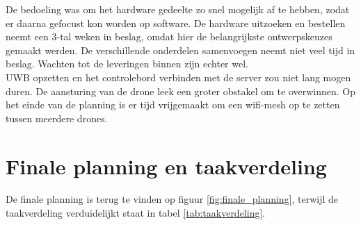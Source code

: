 De bedoeling was om het hardware gedeelte zo snel mogelijk af te hebben, zodat er daarna gefocust kon worden op software.
De hardware uitzoeken en bestellen neemt een 3-tal weken in beslag, omdat hier de belangrijkste ontwerpskeuzes gemaakt werden.
De verschillende onderdelen samenvoegen neemt niet veel tijd in beslag.
Wachten tot de leveringen binnen zijn echter wel.\\

UWB opzetten en het controlebord verbinden met de server zou niet lang mogen duren.
De aansturing van de drone leek een groter obstakel om te overwinnen.
Op het einde van de planning is er tijd vrijgemaakt om een wifi-mesh op te zetten tussen meerdere drones.

\section{Finale planning en taakverdeling} \label{sec:finale_planning}
De finale planning is terug te vinden op figuur \ref{fig:finale_planning}, terwijl de taakverdeling verduidelijkt staat in tabel \ref{tab:taakverdeling}.\\
